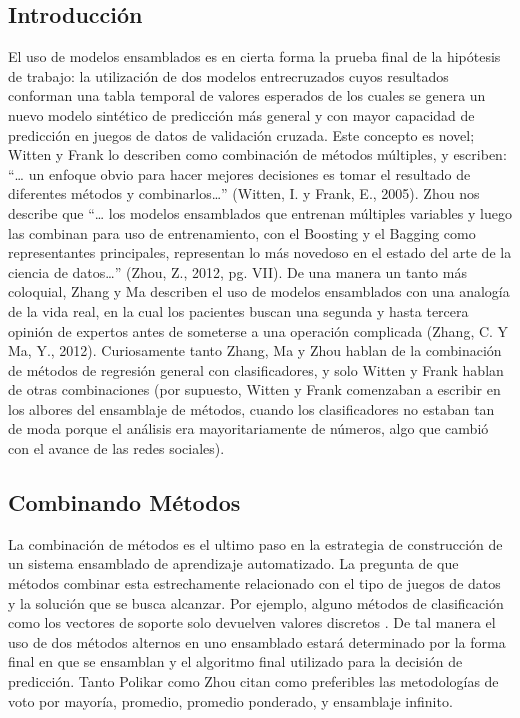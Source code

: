 \documentclass[letterpaper, spanish, 11pt]{report}
\begin{document}
\subsection{Introducción}
El uso de modelos ensamblados es en cierta forma la prueba final de la hipótesis de trabajo: la utilización de dos modelos entrecruzados cuyos resultados conforman una tabla temporal de valores esperados de los cuales se genera un nuevo modelo sintético de predicción más general y con mayor capacidad de predicción en juegos de datos de validación cruzada. Este concepto es novel; Witten y Frank lo describen como combinación de métodos múltiples, y escriben: “… un enfoque obvio para hacer mejores decisiones es tomar el resultado de diferentes métodos y combinarlos…” (Witten, I. y Frank, E., 2005). Zhou nos describe que “… los modelos ensamblados que entrenan múltiples variables y luego las combinan para uso de entrenamiento, con el Boosting y el Bagging como representantes principales, representan lo más novedoso en el estado del arte de la ciencia de datos…” (Zhou, Z., 2012, pg. VII). De una manera un tanto más coloquial, Zhang y Ma describen el uso de modelos ensamblados con una analogía de la vida real, en la cual los pacientes buscan una segunda y hasta tercera opinión de expertos antes de someterse a una operación complicada (Zhang, C. Y Ma, Y., 2012). Curiosamente tanto Zhang, Ma y Zhou hablan de la combinación de métodos de regresión general con clasificadores, y solo Witten y Frank hablan de otras combinaciones (por supuesto, Witten y Frank comenzaban a escribir en los albores del ensamblaje de métodos, cuando los clasificadores no estaban tan de moda porque el análisis era mayoritariamente de números, algo que cambió con el avance de las redes sociales). 

\subsection{Combinando Métodos}
La combinación de métodos es el ultimo paso en la estrategia de construcción de un sistema ensamblado de aprendizaje automatizado. La pregunta de que métodos combinar esta estrechamente relacionado con el tipo de juegos de datos y la solución que se busca alcanzar. Por ejemplo, alguno métodos de clasificación como los vectores de soporte solo devuelven valores discretos \cite{ensembleMachineLearning}. De tal manera el uso de dos métodos alternos en uno ensamblado estará determinado por la forma final en que se ensamblan y el algoritmo final utilizado para la decisión de predicción. Tanto Polikar \cite{ensembleMachineLearning} como Zhou \cite{ensembleMethods} citan como preferibles las metodologías de voto por mayoría, promedio, promedio ponderado, y ensamblaje infinito. 
\end{document}
